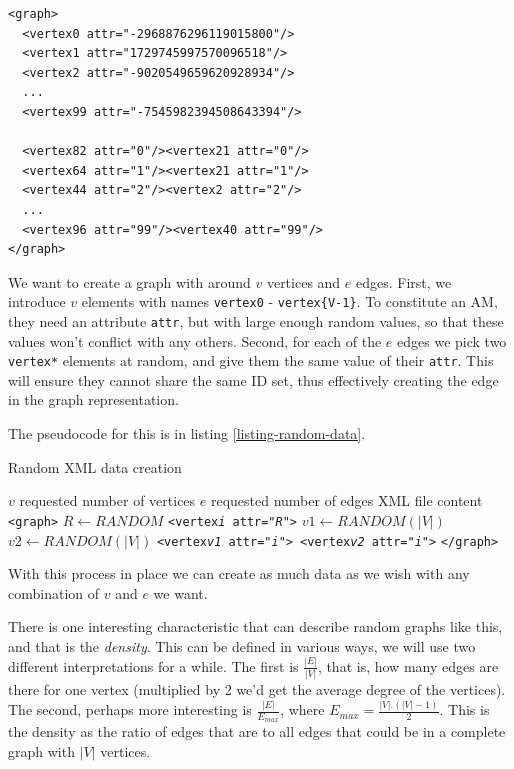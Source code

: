 \documentclass[a4paper,12pt,oneside]{report}
\theoremstyle{definition}
\begin{document}
\begin{scriptsize}
\begin{verbatim}
<graph>
  <vertex0 attr="-2968876296119015800"/>
  <vertex1 attr="1729745997570096518"/>
  <vertex2 attr="-9020549659620928934"/>
  ...
  <vertex99 attr="-7545982394508643394"/>

  <vertex82 attr="0"/><vertex21 attr="0"/>
  <vertex64 attr="1"/><vertex21 attr="1"/>
  <vertex44 attr="2"/><vertex2 attr="2"/>
  ...
  <vertex96 attr="99"/><vertex40 attr="99"/>
</graph>
\end{verbatim}
\end{scriptsize}

We want to create a graph with around $v$ vertices and $e$ edges. First, we introduce $v$ elements with names \texttt{vertex0} - \texttt{vertex\{V-1\}}. To constitute an AM, they need an attribute \texttt{attr}, but with large enough random values, so that these values won't conflict with any others. Second, for each of the $e$ edges we pick two \texttt{vertex*} elements at random, and give them the same value of their \texttt{attr}. This will ensure they cannot share the same ID set, thus effectively creating the edge in the graph representation.

The pseudocode for this is in listing \ref{listing-random-data}.

\begin{algorithm}
\caption{Random XML data creation}
\label{listing-random-data}
\begin{algorithmic}
\REQUIRE $v$ requested number of vertices
\REQUIRE $e$ requested number of edges
\ENSURE XML file content
\PRINT \texttt{<graph>}
	\STATE $R \gets RANDOM$
	\PRINT \texttt{<vertex\textit{i} attr="\textit{R}">}
\ENDFOR
{}
	\STATE $v1 \gets RANDOM(|V|)$
	\STATE $v2 \gets RANDOM(|V|)$
	\PRINT \texttt{<vertex\textit{v1} attr="\textit{i}"> <vertex\textit{v2} attr="\textit{i}">}
\ENDFOR
\PRINT \texttt{</graph>}
\RETURN
\end{algorithmic}
\end{algorithm}

With this process in place we can create as much data as we wish with any combination of $v$ and $e$ we want.

There is one interesting characteristic that can describe random graphs like this, and that is the \textit{density}. This can be defined in various ways, we will use two different interpretations for a while. The first is $\frac{|E|}{|V|}$, that is, how many edges are there for one vertex (multiplied by 2 we'd get the average degree of the vertices). The second, perhaps more interesting is $\frac{|E|}{E_{max}}$, where $E_{max} = \frac{|V|.(|V|-1)}{2}$. This is the density as the ratio of edges that are to all edges that could be in a complete graph with $|V|$ vertices.
\end{document}
